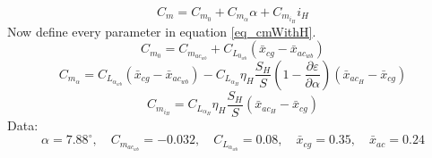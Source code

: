 \begin{equation}
C_m = C_{m_0} + C_{m_\alpha}\alpha + C_{m_{i_H}} i_H
\label{eq_cmWithH}
\end{equation}
Now define every parameter in equation \ref{eq_cmWithH}.
$$C_{m_0} = C_{m_{ac_{wb}}} + C_{L_{0_{wb}}}(\bar x_{cg} - \bar x_{ac_{wb}})$$
$$C_{m_\alpha} = C_{L_{\alpha_{wb}}}(\bar x_{cg} - \bar x_{ac_{wb}})-
C_{L_{\alpha_{H}}}\eta_H
\dfrac{S_H}{S}
(1-\dfrac{\partial \varepsilon}{\partial \alpha})
(\bar x_{ac_{H}}-\bar x_{cg})
$$
$$C_{m_{i_H}} = C_{L_{\alpha_{H}}}\eta_H
\dfrac{S_H}{S}
(\bar x_{ac_{H}}-\bar x_{cg})$$
Data:
$$\alpha = 7.88^{\circ},\quad C_{m_{ac_{wb}}} = -0.032,\quad C_{L_{\alpha_{wb}}}= 0.08
,\quad \bar x_{cg} = 0.35
,\quad \bar x_{ac} = 0.24
$$